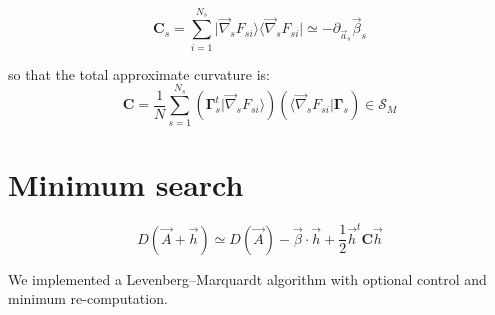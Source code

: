 \documentclass[aps,12pt]{revtex4}
\begin{document}
\begin{equation}
	\bm{C}_s = \sum_{i=1}^{N_s} \vert \vec{\nabla}_s F_{si} \rangle  \langle \vec{\nabla}_s F_{si} \vert \simeq -\partial_{\vec{a}_s} \vec{\beta}_s 
\end{equation}

so that the total approximate curvature is:
\begin{equation}
	\bm{C} =  \dfrac{1}{N} \sum_{s=1}^{N_s} \left(  \bm{\Gamma}_s^t \vert \vec{\nabla}_s F_{si} \rangle\right) \left( \langle \vec{\nabla}_s F_{si} \vert \bm{\Gamma}_s\right) \in \mathcal{S}_M
\end{equation}


\section{Minimum search}

\begin{equation}
	D(\vec{A} + \vec{h}) \simeq D(\vec{A}) - \vec{\beta} \cdot \vec{h} + \dfrac{1}{2} \vec{h}^t \bm{C} \vec{h}
\end{equation}

We implemented a Levenberg–Marquardt algorithm with optional control and minimum re-computation.
\end{document}
